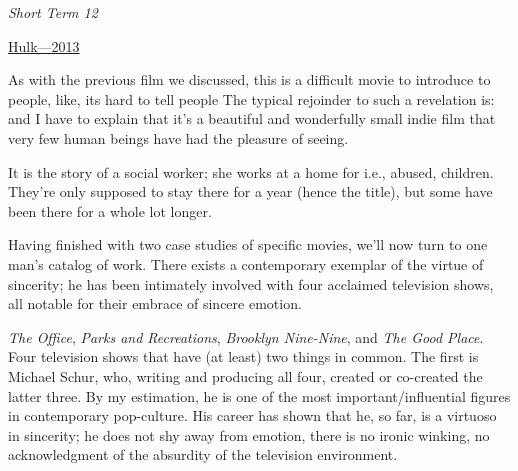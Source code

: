 \documentclass[../butidigress.tex]{subfiles}
\begin{document}

\begin{somenotes}{\textit{Short Term 12}}
    \item \href{https://birthmoviesdeath.com/2013/03/16/sxsw-review-why-short-term-12-is-a-masterpiece}{Hulk---2013}\autocite{hulkshortterm2015}
\end{somenotes}

As with the previous film we discussed, this is a difficult movie to introduce to people, like, its hard to tell people 
The typical rejoinder to such a revelation is:  and I have to explain that it's a beautiful and wonderfully small indie film that very few human beings have had the pleasure of seeing.

It is the story of a social worker; she works at a home for  i.e., abused, children.
They're only supposed to stay there for a year (hence the title), but some have been there for a whole lot longer.

\entryskip

Having finished with two case studies of specific movies, we'll now turn to one man's catalog of work.
There exists a contemporary exemplar of the virtue of sincerity; he has been intimately involved with four acclaimed television shows, all notable for their embrace of sincere emotion.

\textit{The Office}, \textit{Parks and Recreations}, \textit{Brooklyn Nine-Nine}, and \textit{The Good Place}.
Four television shows that have (at least) two things in common.
The first is Michael Schur, who, writing and producing all four, created or co-created the latter three.
By my estimation, he is one of the most important/influential figures in contemporary pop-culture.
His career has shown that he, so far, is a virtuoso in sincerity; he does not shy away from emotion, there is no ironic winking, no acknowledgment of the absurdity of the television environment.
\end{document}
